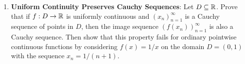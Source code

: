 \begin{enumerate}
  \begin{enumerate}
    \item Prove that every convergent sequence in $\R$ is Cauchy.
    \item Give an example of a sequence of rational numbers that is Cauchy in $\Q$, but does not converge to any rational number in $\Q$. (This illustrates why completeness of $\R$ is equivalent to asserting that every Cauchy sequence converges.)
  \end{enumerate}
  \item \textbf{Uniform Continuity Preserves Cauchy Sequences}:
  Let $D \subseteq \mathbb{R}$. Prove that if $f: D \to \mathbb{R}$ is uniformly continuous and $(x_n)_{n=1}^\infty$ is a Cauchy sequence of points in $D$, then the image sequence $(f(x_n))_{n=1}^\infty$ is also a Cauchy sequence. Then show that this property fails for ordinary pointwise continuous functions by considering $f(x) = 1/x$ on the domain $D = (0, 1)$ with the sequence $x_n = 1/(n+1)$.
\end{enumerate}

\newpage
